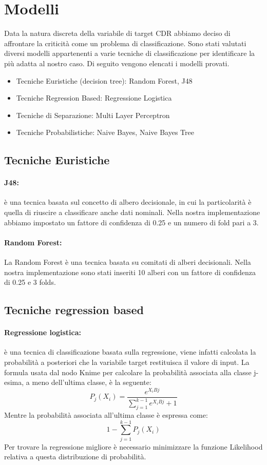 \section{Modelli}
Data la natura discreta della variabile di target CDR abbiamo deciso di affrontare la criticità come un problema di classificazione.
Sono stati valutati diversi modelli appartenenti a varie tecniche di classificazione per identificare la più adatta al nostro caso. Di seguito vengono elencati i modelli provati.
\begin{itemize}
\setlength\itemsep{0.2em}
    \item Tecniche Euristiche (decision tree): Random Forest, J48
    \item Tecniche Regression Based: Regressione Logistica
    \item Tecniche di Separazione: Multi Layer Perceptron
    \item Tecniche Probabilistiche: Naive Bayes, Naive Bayes Tree
\end{itemize}

\subsection{Tecniche Euristiche} 

\paragraph{J48:} è una tecnica basata sul concetto di albero decisionale, in cui la particolarità è quella di riuscire a classificare anche dati nominali. Nella nostra implementazione abbiamo impostato un fattore di confidenza di 0.25 e un numero di fold pari a 3.

\paragraph{Random Forest:} La Random Forest è una tecnica basata su comitati di alberi decisionali. Nella nostra implementazione sono stati inseriti 10 alberi con un fattore di confidenza di 0.25 e 3 folds.

\subsection{Tecniche regression based}

\paragraph{Regressione logistica:}è una tecnica di classificazione basata sulla regressione, viene infatti calcolata la probabilità a posteriori che la variabile target restituisca il valore di input. La formula usata dal nodo Knime per calcolare la probabilità associata alla classe j-esima, a meno dell'ultima classe, è la seguente:
\[P_j(X_i) = \frac{e^{X_iBj}}{\sum_{j=1}^{k-1}e^{X_iBj}+1}\]
Mentre la probabilità associata all'ultima classe è espressa come:
\[1- \sum_{j=1}^{k-1}P_j(X_i)\]
Per trovare la regressione migliore è necessario minimizzare la funzione Likelihood relativa a questa distribuzione di probabilità.

